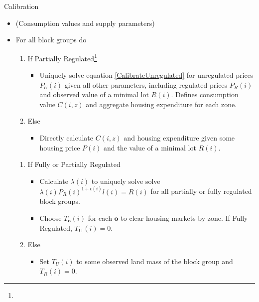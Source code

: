\documentclass[12pt]{article}
\begin{document}
	\begin{algorithm}
		\caption{Calibration}
		
		
			\begin{itemize}
			\item[] (Consumption values and supply parameters)
			\item[] For all block groups do
			
				\begin{enumerate}
					\item[] If Partially Regulated\footnote{}
					
					\begin{itemize}
						\item[] Uniquely solve equation \eqref{CalibrateUnregulated} for unregulated prices $P_{U}(i)$ given all other parameters, including regulated prices $P_{R}(i)$ and observed value of a minimal lot $R(i)$. Defines consumption value $C(i, z)$ and aggregate housing expenditure for each zone.
					\end{itemize}
					
					\item[]Else 
					
					\begin{itemize}
						\item[] Directly calculate $C(i, z)$ and housing expenditure given some housing price $P(i)$ and the value of a minimal lot $R(i)$. 
					\end{itemize}
									
				\end{enumerate}
				
				\begin{enumerate}
					\item[] If Fully or Partially Regulated
					\begin{itemize}
						\item[] Calculate $\lambda(i)$ to uniquely solve solve $\lambda(i)P_{R}(i)^{1 + \epsilon(i)}l(i) = R(i)$ for all partially or fully regulated block groups.
						
						\item[] Choose $T_{\boldsymbol{o}}(i)$ for each $\boldsymbol{o}$ to clear housing markets by zone. If Fully Regulated, $T_{\boldsymbol{U}}(i) = 0$.
						
					\end{itemize}
					
					\item[] Else
					\begin{itemize}
						\item[] Set $T_{U}(i)$ to some observed land mass of the block group and $T_{R}(i) = 0$. 
						

\end{itemize}
\end{enumerate}
\end{itemize}
\end{algorithm}
\end{document}
